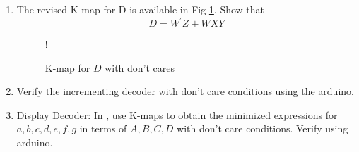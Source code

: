 \begin{enumerate}[label=\arabic*.,ref=\theenumi]
%
\item  The revised K-map for D is available in Fig \ref{fig:kmap_D_x}.  Show that 
%
\begin{equation}
D  = {W}^{\prime}{Z} + {W}{X}{Y}
\end{equation}
\begin{figure}[H]
	\centering
\resizebox {0.5\columnwidth} {!} {

}
\caption{K-map for $D$ with don't cares}
\label{fig:kmap_D_x}
\end{figure}
%
\item 
	Verify the incrementing decoder with don't care conditions using the arduino.
\item {Display Decoder:}
In ,
use K-maps to obtain the minimized expressions for $a,b,c,d,e,f,g$ in terms of $A,B,C,D$ with  don't care conditions.  Verify using arduino.
\end{enumerate}




